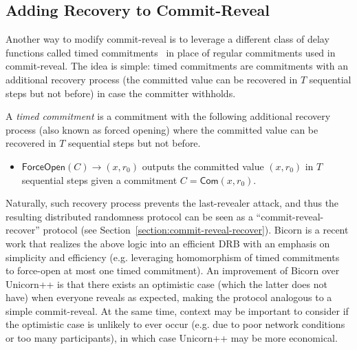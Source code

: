 \subsection{Adding Recovery to Commit-Reveal}
Another way to modify commit-reveal is to leverage a different class of delay functions called timed commitments~\cite{boneh2000timed} in place of regular commitments used in commit-reveal.
The idea is simple: timed commitments are commitments with an additional recovery process (the committed value can be recovered in $T$ sequential steps but not before) in case the committer withholds.

\begin{definition}
A \textit{timed commitment} is a commitment with the following additional recovery process (also known as forced opening) where the committed value can be recovered in $T$ sequential steps but not before.
\begin{itemize}
\item $\mathsf{ForceOpen}(C) \rightarrow (x, r_0)$ outputs the committed value $(x, r_0)$ in $T$ sequential steps given a commitment $C = \mathsf{Com}(x, r_0)$.
\end{itemize}
\end{definition}

Naturally, such recovery process prevents the last-revealer attack, and thus the resulting distributed randomness protocol can be seen as a ``commit-reveal-recover'' protocol (see Section~\ref{section:commit-reveal-recover}).
Bicorn is a recent work that realizes the above logic into an efficient DRB with an emphasis on simplicity and efficiency (e.g. leveraging homomorphism of timed commitments~\cite{thyagarajan2021efficient} to force-open at most one timed commitment).
An improvement of Bicorn over Unicorn++ is that there exists an optimistic case (which the latter does not have) when everyone reveals as expected, making the protocol analogous to a simple commit-reveal.
At the same time, context may be important to consider if the optimistic case is unlikely to ever occur (e.g. due to poor network conditions or too many participants), in which case Unicorn++ may be more economical.

